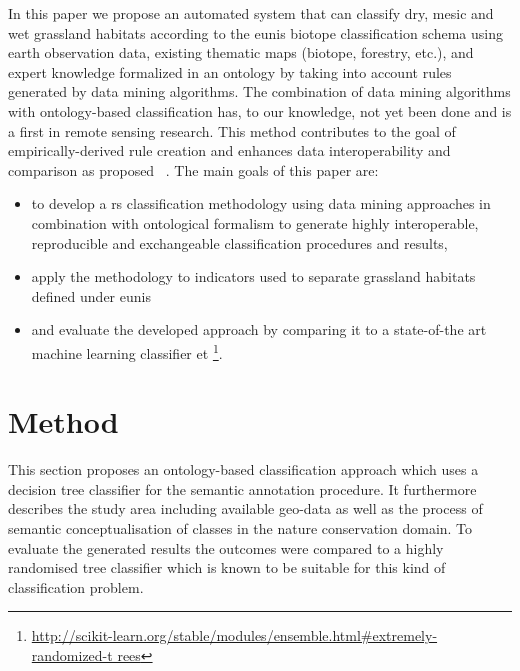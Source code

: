 \documentclass[authoryear,review,12pt,number]{elsarticle}
\begin{document}
In this paper we propose an automated system that can classify dry, mesic and 
wet grassland habitats according to the \gls{eunis} biotope classification 
schema using earth observation data, existing thematic maps (biotope, forestry, 
etc.), and expert knowledge formalized in an ontology by taking into account 
rules generated by data mining algorithms. The combination of data mining 
algorithms with ontology-based classification has, to our knowledge, not yet 
been done and is a first in remote sensing research. This method contributes to 
the goal of empirically-derived rule creation and enhances data 
interoperability and comparison as proposed ~\cite{Janowicz2012}. The main 
goals of this paper are:
\begin{itemize}
 \item to develop a \gls{rs} classification methodology using data mining 
approaches
     in combination with ontological formalism to generate highly interoperable,
     reproducible and exchangeable classification procedures and results,
 \item apply the methodology to indicators used to separate grassland habitats
     defined under \gls{eunis}
 \item and evaluate the developed approach by comparing it to a state-of-the art
     machine learning classifier \gls{et}
\footnote{\url{
http://scikit-learn.org/stable/modules/ensemble.html\#extremely-randomized-t
rees}}.
\end{itemize}

\section{Method}
This section proposes an ontology-based classification approach which uses a
decision tree classifier for the semantic annotation procedure. It furthermore
describes the study area including available geo-data as well as the process of
semantic conceptualisation of classes in the nature conservation domain. To
evaluate the generated results the outcomes were compared to a highly randomised
tree classifier which is known to be suitable for this kind of classification
problem. %
\end{document}
